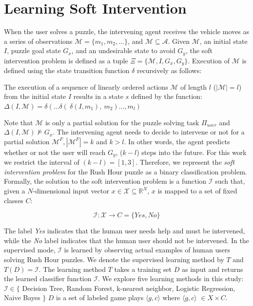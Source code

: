 \section*{Learning Soft Intervention} %
When the user solves a puzzle, the intervening agent receives the vehicle moves as a series of observations $\mathcal{M}=\lbrace m_1, m_2, \ldots \rbrace$, and $\mathcal{M} \subseteq \mathcal{A}$. Given $\mathcal{M}$, an initial state $I$, puzzle goal state $G_x$, and an undesirable state to avoid $G_y$, the soft intervention problem is defined as a tuple $\Xi=\lbrace \mathcal{M}, I, G_x, G_y\rbrace$. Execution of $\mathcal{M}$ is defined using the state transition function $\delta$ recursively as follows:

\begin{definition}
The execution of a sequence of linearly ordered actions $\mathcal{M}$ of length $l$ ($|\mathcal{M}|=l$) from the initial state $I$ results in a state $s$ defined by the function: $\Delta (I, \mathcal{M}) = \delta( \ldots \delta(\:\delta(I,m_1),\:m_2) \ldots, m_l)$
\end{definition}

Note that $\mathcal{M}$ is only a partial solution for the puzzle solving task $\Pi_{user}$ and $\Delta (I, \mathcal{M}) \not\models G_x$. The intervening agent needs to decide to intervene or not for a partial solution $\mathcal{M}^F, |\mathcal{M}^F|=k$ and $k>l$. In other words, the agent predicts whether or not the user will reach $G_y$, ($k-l$) steps into the future. For this work we restrict the interval of $(k-l)=[1,3]$. Therefore, we represent the \textit{soft intervention problem} for the Rush Hour puzzle as a binary classification problem. Formally, the solution to the soft intervention problem is a function $\mathcal{I}$ such that, given a $N$-dimensional input vector $x \in \mathcal{X} \subseteq \mathbb{R}^N$, $x$ is mapped to a set of fixed classes $C$:

\begin{equation}
\mathcal{I} : \mathcal{X} \to C=\lbrace Yes, No\rbrace
\end{equation}

The label \textit{Yes} indicates that the human user needs help and must be intervened, while the \textit{No} label indicates that the human user should not be intervened. In the supervised mode, $\mathcal{I}$ is learned by observing actual examples of human users solving Rush Hour puzzles. We denote the supervised learning method by $T$ and $T(D)=\mathcal{I}$. The learning method $T$ takes a training set $D$ as input and returns the learned classifier function $\mathcal{I}$. We explore five learning methods in this study: $\mathcal{I} \in \lbrace $ Decision Tree, Random Forest, k-nearest neighbor, Logistic Regression, Naive Bayes $\rbrace$  $D$ is a set of labeled game plays $\langle g, c\rangle$ where $\langle g, c\rangle$ $\in X \times C$. 

